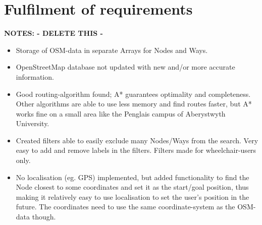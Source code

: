 \section{Fulfilment of requirements}
\textbf{NOTES: - DELETE THIS -}
\begin{itemize}
	\item Storage of OSM-data in separate Arrays for Nodes and Ways.
	\item OpenStreetMap database not updated with new and/or more accurate information.
	\item Good routing-algorithm found; A* guarantees optimality and completeness. Other algorithms are able to use less memory and find routes faster, but A* works fine on a small area like the Penglais campus of Aberystwyth University.
	\item Created filters able to easily exclude many Nodes/Ways from the search. Very easy to add and remove labels in the filters. Filters made for wheelchair-users only.
	\item No localisation (eg. GPS) implemented, but added functionality to find the Node closest to some coordinates and set it as the start/goal position, thus making it relatively easy to use localisation to set the user's position in the future. The coordinates need to use the same coordinate-system as the OSM-data though.
\end{itemize}

